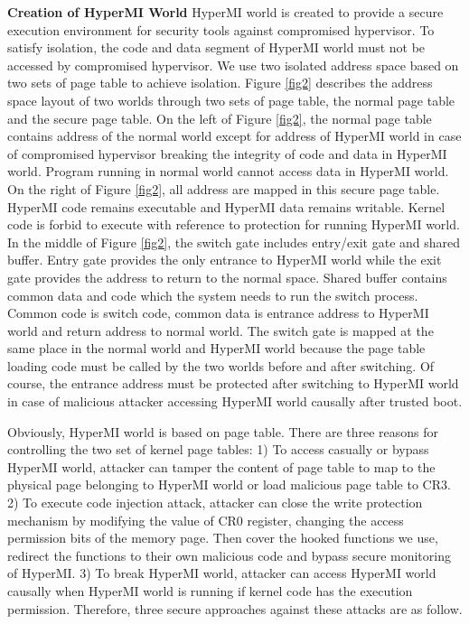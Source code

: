 \documentclass[conference]{IEEEtran}
\begin{document}
\textbf{Creation of HyperMI World}
HyperMI world is created to provide a secure execution environment for security tools against compromised hypervisor. To satisfy isolation, the code and data segment of HyperMI world must not be accessed by compromised hypervisor. We use two isolated address space based on two sets of page table to achieve isolation.
Figure \ref{fig2} describes the address space layout of two worlds through two sets of page table, the normal page table and the secure page table. On the left of Figure \ref{fig2}, the normal page table contains address of the normal world except for address of HyperMI world in case of compromised hypervisor breaking the integrity of code and data in HyperMI world. Program running in normal world cannot access data in HyperMI world. On the right of Figure \ref{fig2}, all address are mapped in this secure page table.
HyperMI code remains executable and HyperMI data remains writable. Kernel code is forbid to execute with reference to protection for running HyperMI world. 
In the middle of Figure \ref{fig2}, the switch gate includes entry/exit gate and shared buffer. Entry gate provides the only entrance to HyperMI world while the exit gate provides the address to return to the normal space. Shared buffer contains common data and code which the system needs to run the switch process. Common code is switch code, common data is entrance address to HyperMI world and return address to normal world. The switch gate is mapped at the same place in the normal world and HyperMI world because the page table loading code must be called by the two worlds before and after switching. Of course, the entrance address must be protected after switching to HyperMI world in case of malicious attacker accessing HyperMI world causally after trusted boot. 



Obviously, HyperMI world is based on page table. There are three reasons for controlling the two set of kernel page tables: 1) To access casually or bypass HyperMI world, attacker can tamper the content of page table to map to the physical page belonging to HyperMI world or load malicious page table to CR3. 2) To execute code injection attack, attacker can close the write protection mechanism by modifying the value of CR0 register, changing the access permission bits of the memory page. Then cover the hooked functions we use, redirect the functions to their own malicious code and bypass secure monitoring of HyperMI. 3) To break HyperMI world, attacker can access HyperMI world causally when HyperMI world is running if kernel code has the execution permission. Therefore, three secure approaches against these attacks are as follow.
\end{document}
